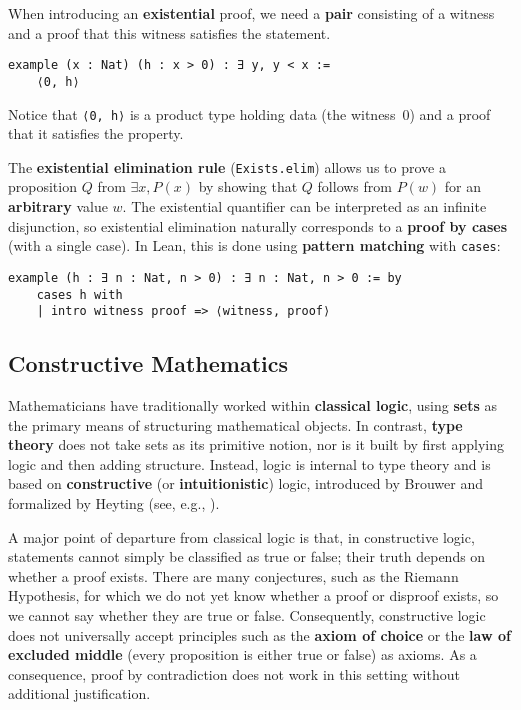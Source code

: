 \begin{example}
  When introducing an \textbf{existential} proof,
  we need a \textbf{pair} consisting
  of a witness and a proof that this witness
  satisfies the statement.
  \begin{lstlisting}[language=lean]
  example (x : Nat) (h : x > 0) : ∃ y, y < x :=
    ⟨0, h⟩
  \end{lstlisting}
  Notice that \lstinline[language=lean]|⟨0, h⟩| is a product type holding
  data (the witness~0) and a proof that it satisfies the property.
\end{example}
\begin{example}
  The \textbf{existential elimination rule}
  (\lstinline[language=lean]|Exists.elim|) allows us to prove a proposition $Q$
  from $\exists x, P(x)$ by showing that $Q$ follows from $P(w)$
  for an \textbf{arbitrary} value $w$.
  The existential quantifier can be interpreted as an infinite disjunction,
  so existential elimination naturally corresponds to a \textbf{proof by cases}
  (with a single case).
  In Lean, this is done using \textbf{pattern matching}
  with \lstinline[language=lean]|cases|:
  \newpage
  \begin{lstlisting}[language=lean]
  example (h : ∃ n : Nat, n > 0) : ∃ n : Nat, n > 0 := by
    cases h with
    | intro witness proof => ⟨witness, proof⟩
  \end{lstlisting}
\end{example}


\subsection{Constructive Mathematics}

Mathematicians have traditionally worked within \textbf{classical logic},
using \textbf{sets} as the primary means of structuring mathematical objects.
In contrast, \textbf{type theory} does not take sets as its primitive notion,
nor is it built by first applying logic and then adding structure.
Instead, logic is internal to type theory and is based on \textbf{constructive}
(or \textbf{intuitionistic}) logic, introduced by Brouwer and formalized by
Heyting (see, e.g., \cite{girard1989proofs}).

A major point of departure from classical logic is that, in constructive logic,
statements cannot simply be classified as true or false;
their truth depends on whether a proof exists.
There are many conjectures, such as the Riemann Hypothesis,
for which we do not yet know whether a proof or disproof exists,
so we cannot say whether they are true or false.
Consequently, constructive logic does not universally accept principles such
as the \textbf{axiom of choice} or the \textbf{law of excluded middle}
(every proposition is either true or false) as axioms.
As a consequence, proof by contradiction does not work in this setting
without additional justification.

